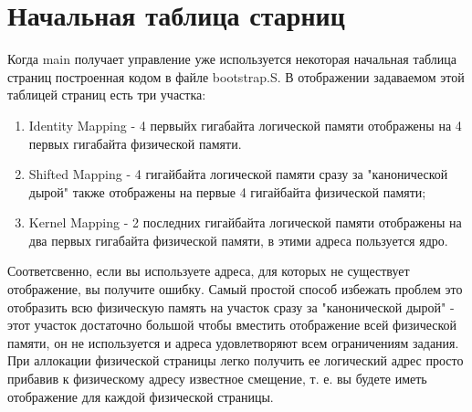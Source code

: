 \section{Начальная таблица старниц}

Когда main получает управление уже используется некоторая начальная таблица
страниц построенная кодом в файле bootstrap.S. В отображении задаваемом этой
таблицей страниц есть три участка:

\begin{enumerate}
  \item Identity Mapping - 4 первыйх гигабайта логической памяти отображены на
  4 первых гигабайта физической памяти.
  \item Shifted Mapping - 4 гигайбайта логической памяти сразу за "канонической
  дырой" также отображены на первые 4 гигайбайта физической памяти;
  \item Kernel Mapping - 2 последних гигайбайта логической памяти отображены
  на два первых гигабайта физической памяти, в этими адреса пользуется ядро.
\end{enumerate}

Соответсвенно, если вы используете адреса, для которых не существует
отображение, вы получите ошибку. Самый простой способ избежать проблем это
отобразить всю физическую память на участок сразу за "канонической дырой" - этот
участок достаточно большой чтобы вместить отображение всей физической памяти,
он не используется и адреса удовлетворяют всем ограничениям задания. При
аллокации физической страницы легко получить ее логический адрес просто
прибавив к физическому адресу известное смещение, т. е. вы будете иметь
отображение для каждой физической страницы.
